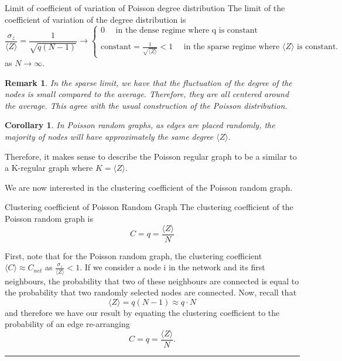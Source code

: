 \documentclass[twoside]{article}
\newtheorem{corollary}[theorem]{Corollary}
\newtheorem{remark}[theorem]{Remark}
\newenvironment{proof}{{\bf Proof:}}{\hfill\rule{2mm}{2mm}}
\begin{document}
\begin{proposition_exam}{Limit of coefficient of variation of Poisson degree distribution}{} 
The limit of the coefficient of variation of the degree distribution is 
$$
\frac{\sigma_z}{\langle Z \rangle} = \frac{1}{\sqrt{q(N - 1)}} \rightarrow 
\begin{cases}
0 \quad \text{ in the dense regime where q is constant}\\\\
\text{constant} = \frac{1}{\sqrt{\langle Z \rangle}} < 1 \quad \text{ in the sparse regime where } \langle Z \rangle \text{ is constant.}
\end{cases}
$$
as $N \rightarrow \infty$.
\end{proposition_exam}

\begin{remark}In the sparse limit, we have that the fluctuation of the degree of the nodes is small compared to the average. Therefore, they are all centered around the average. This agree with the usual construction of the Poisson distribution.
\end{remark}

\begin{corollary} In Poisson random graphs, as edges are placed randomly, the majority of nodes will have approximately the same degree $\langle Z \rangle.$
\end{corollary}

Therefore, it makes sense to describe the Poisson regular graph to be a similar to a K-regular graph where $K = \langle Z \rangle.$


We are now interested in the clustering coefficient of the Poisson random graph. 

\begin{proposition_exam}{Clustering coefficient of Poisson Random Graph}{} The clustering coefficient of the Poisson random graph is 
$$
C = q = \frac{\langle Z \rangle}{N}
$$
\end{proposition_exam}
\begin{proof} First, note that for the Poisson random graph, the clustering coefficient $\langle C \rangle \approx C_{net}$ as $\frac{\sigma_z}{\langle Z \rangle} < 1.$ If we consider a node i in the network and its first neighbours, the probability that two of these neighbours are connected is equal to the probability that two randomly selected nodes are connected. Now, recall that 
$$
\langle Z \rangle = q(N - 1) \approx q\cdot N
$$
and therefore we have our result by equating the clustering coefficient to the probability of an edge re-arranging
$$
C = q = \frac{\langle Z \rangle}{N}.
$$
\end{proof}
\end{document}
